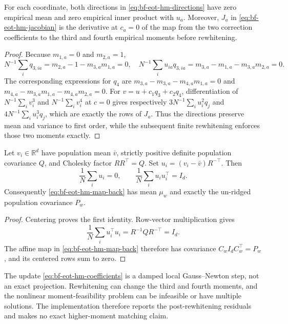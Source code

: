 \begin{proposition}
\label{prop:bf-eot-hm-projected-jacobian}
For each coordinate, both directions in
\eqref{eq:bf-eot-hm-directions} have zero empirical mean and zero empirical
inner product with \(u_a\).  Moreover, \(J_a\) in
\eqref{eq:bf-eot-hm-jacobian} is the derivative at \(c_a=0\) of the map from
the two correction coefficients to the third and fourth empirical moments
before rewhitening.
\end{proposition}

\begin{proof}
Because \(m_{1,a}=0\) and \(m_{2,a}=1\),
\[
 N^{-1}\sum_iq_{3,ia}=m_{2,a}-1-m_{3,a}m_{1,a}=0,
 \quad
 N^{-1}\sum_i u_{ia}q_{3,ia}=m_{3,a}-m_{1,a}-m_{3,a}m_{2,a}=0.
\]
The corresponding expressions for \(q_4\) are
\(m_{3,a}-m_{3,a}-m_{4,a}m_{1,a}=0\) and
\(m_{4,a}-m_{3,a}m_{1,a}-m_{4,a}m_{2,a}=0\).
For \(v=u+c_1q_3+c_2q_4\), differentiation of
\(N^{-1}\sum_i v_i^3\) and \(N^{-1}\sum_i v_i^4\) at \(c=0\) gives
respectively \(3N^{-1}\sum_i u_i^2q_j\) and
\(4N^{-1}\sum_i u_i^3q_j\), which are exactly the rows of \(J_a\).
Thus the directions preserve mean and variance to first order, while the
subsequent finite rewhitening enforces those two moments exactly.
\end{proof}

\begin{proposition}
\label{prop:bf-eot-hm-rewhitening}
Let \(v_i\in\mathbb R^d\) have population mean \(\bar v\), strictly positive
definite population covariance \(Q\), and Cholesky factor \(RR^\top=Q\).
Set \(u_i=(v_i-\bar v)R^{-\top}\).  Then
\begin{equation}
 \frac1N\sum_i u_i=0,
 \qquad
 \frac1N\sum_i u_i u_i^\top=I_d.
\end{equation}
Consequently \eqref{eq:bf-eot-hm-map-back} has mean \(\mu_w\) and exactly
the un-ridged population covariance \(P_w\).
\end{proposition}

\begin{proof}
Centering proves the first identity.  Row-vector multiplication gives
\[
 \frac1N\sum_i u_i^\top u_i=R^{-1}QR^{-\top}=I_d.
\]
The affine map in \eqref{eq:bf-eot-hm-map-back} therefore has covariance
\(C_wI_dC_w^\top=P_w\), and its centered rows sum to zero.
\end{proof}

The update \eqref{eq:bf-eot-hm-coefficients} is a damped local
Gauss--Newton step, not an exact projection.  Rewhitening can change the third
and fourth moments, and the nonlinear moment-feasibility problem can be
infeasible or have multiple solutions.  The implementation therefore reports
the post-rewhitening residuals and makes no exact higher-moment matching claim.

